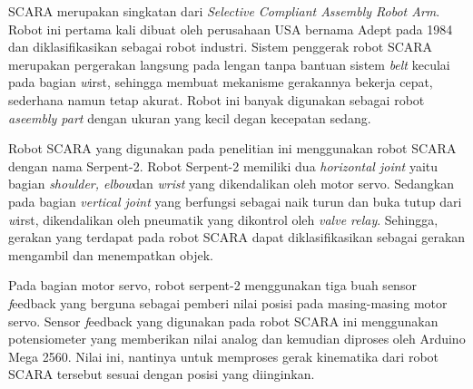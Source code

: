 SCARA merupakan singkatan dari \emph{Selective Compliant Assembly Robot Arm}. Robot ini pertama kali dibuat oleh perusahaan USA bernama Adept pada 1984 dan diklasifikasikan sebagai robot industri. Sistem penggerak robot SCARA merupakan pergerakan langsung pada lengan tanpa bantuan sistem \emph{belt} keculai pada bagian \emph wirst, sehingga membuat mekanisme gerakannya bekerja cepat, sederhana namun tetap akurat. Robot ini banyak digunakan sebagai robot \emph {aseembly part} dengan ukuran yang kecil degan kecepatan sedang. 

Robot SCARA yang digunakan pada penelitian ini menggunakan robot SCARA dengan nama Serpent-2. Robot Serpent-2 memiliki dua \textit{horizontal joint} yaitu bagian \textit{shoulder, elbow}dan \textit{wrist} yang dikendalikan oleh motor servo. Sedangkan pada bagian \textit{vertical joint} yang berfungsi sebagai naik turun dan buka tutup dari \emph wirst, dikendalikan oleh pneumatik yang dikontrol oleh \emph {valve relay}. Sehingga, gerakan yang terdapat pada robot SCARA dapat diklasifikasikan sebagai gerakan mengambil dan menempatkan objek. 
\begin{table}[H]
	\centering
	\caption{Spesifikasi Robot Serpent-2}
		\end{table}
		
		Pada bagian motor servo, robot serpent-2 menggunakan tiga buah sensor \emph feedback yang berguna sebagai pemberi nilai posisi pada masing-masing motor servo. Sensor \emph feedback yang digunakan pada robot SCARA ini menggunakan potensiometer yang memberikan nilai analog dan kemudian diproses oleh Arduino Mega 2560. Nilai ini, nantinya untuk memproses gerak kinematika dari robot SCARA tersebut sesuai dengan posisi yang diinginkan.



